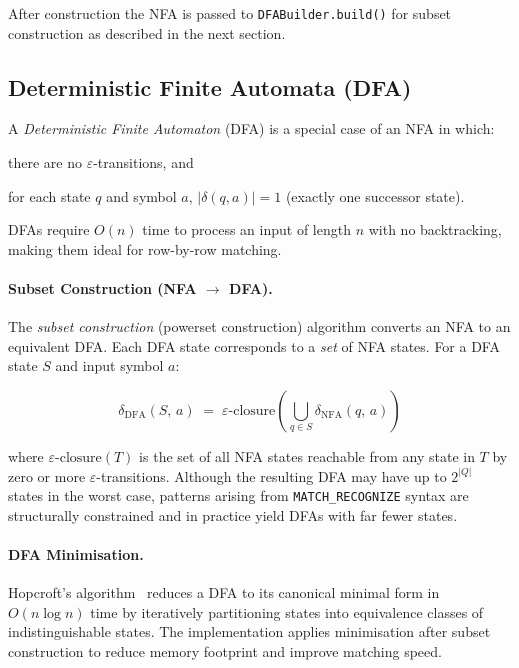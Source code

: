 After construction the NFA is passed to \texttt{DFABuilder.build()}
for subset construction as described in the next section.

\subsection{Deterministic Finite Automata (DFA)}
\label{subsec:meth-dfa}

A \emph{Deterministic Finite Automaton} (DFA) is a special case of
an NFA in which:
\begin{inparaenum}[(i)]
  \item there are no $\varepsilon$-transitions, and
  \item for each state $q$ and symbol $a$, $|\delta(q,a)| = 1$
    (exactly one successor state).
\end{inparaenum}
DFAs require $O(n)$ time to process an input of length $n$ with no
backtracking, making them ideal for row-by-row matching.

\paragraph{Subset Construction (NFA $\to$ DFA).}
The \emph{subset construction} (powerset construction) algorithm
converts an NFA to an equivalent DFA.  Each DFA state corresponds
to a \emph{set} of NFA states.  For a DFA state $S$ and input
symbol $a$:

\[
  \delta_{\text{DFA}}(S,\,a)
  \;=\;
  \varepsilon\text{-closure}\!\left(
    \bigcup_{q \in S} \delta_{\text{NFA}}(q,\,a)
  \right)
\]

where $\varepsilon\text{-closure}(T)$ is the set of all NFA states
reachable from any state in $T$ by zero or more
$\varepsilon$-transitions.  Although the resulting DFA may have up
to $2^{|Q|}$ states in the worst case, patterns arising from
\texttt{MATCH\_RECOGNIZE} syntax are structurally constrained and in
practice yield DFAs with far fewer states.

\paragraph{DFA Minimisation.}
Hopcroft's algorithm~\cite{HopcroftUllman} reduces a DFA to its
canonical minimal form in $O(n \log n)$ time by iteratively
partitioning states into equivalence classes of
indistinguishable states.  The implementation applies minimisation
after subset construction to reduce memory footprint and improve
matching speed.

